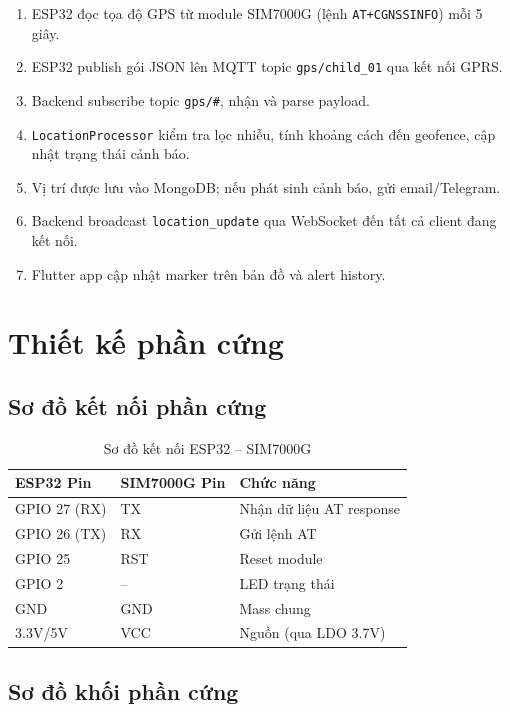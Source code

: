 \begin{enumerate}
  \item ESP32 đọc tọa độ GPS từ module SIM7000G (lệnh \texttt{AT+CGNSSINFO}) mỗi 5 giây.
  \item ESP32 publish gói JSON lên MQTT topic \texttt{gps/child\_01} qua kết nối GPRS.
  \item Backend subscribe topic \texttt{gps/\#}, nhận và parse payload.
  \item \texttt{LocationProcessor} kiểm tra lọc nhiễu, tính khoảng cách đến geofence, cập nhật trạng thái cảnh báo.
  \item Vị trí được lưu vào MongoDB; nếu phát sinh cảnh báo, gửi email/Telegram.
  \item Backend broadcast \texttt{location\_update} qua WebSocket đến tất cả client đang kết nối.
  \item Flutter app cập nhật marker trên bản đồ và alert history.
\end{enumerate}

\section{Thiết kế phần cứng}

\subsection{Sơ đồ kết nối phần cứng}

\begin{table}[H]
\centering
\caption{Sơ đồ kết nối ESP32 -- SIM7000G}
\label{tab:hardware_pinout}
\begin{tabular}{l l l}
\toprule
\textbf{ESP32 Pin} & \textbf{SIM7000G Pin} & \textbf{Chức năng} \\
\midrule
GPIO 27 (RX) & TX & Nhận dữ liệu AT response \\
GPIO 26 (TX) & RX & Gửi lệnh AT \\
GPIO 25     & RST & Reset module \\
GPIO 2      & --  & LED trạng thái \\
GND         & GND & Mass chung \\
3.3V/5V     & VCC & Nguồn (qua LDO 3.7V) \\
\bottomrule
\end{tabular}
\end{table}

\subsection{Sơ đồ khối phần cứng}

